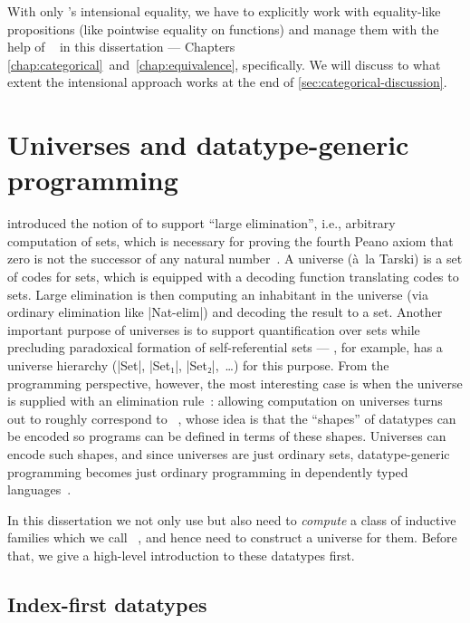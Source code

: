 With only \Agda's intensional equality, we have to explicitly work with equality-like propositions (like pointwise equality on functions) and manage them with the help of ~\citep{Barthe-setoids} in this dissertation --- Chapters \ref{chap:categorical}~and~\ref{chap:equivalence}, specifically.
We will discuss to what extent the intensional approach works at the end of \autoref{sec:categorical-discussion}.

\section{Universes and datatype-generic programming}
\label{sec:universes}

\citet{ML-TT84} introduced the notion of  to support ``large elimination'', i.e., arbitrary computation of sets, which is necessary for proving the fourth Peano axiom that zero is not the successor of any natural number~\citep{Smith-independence-fourth-axiom}.
A universe (à~la Tarski) is a set of codes for sets, which is equipped with a decoding function translating codes to sets.
Large elimination is then computing an inhabitant in the universe (via ordinary elimination like |Nat-elim|) and decoding the result to a set.
Another important purpose of universes is to support quantification over sets while precluding paradoxical formation of self-referential sets --- \Agda, for example, has a universe hierarchy (|Set|, |Set₁|, |Set₂|,~\ldots\!) for this purpose.
From the programming perspective, however, the most interesting case is when the universe is supplied with an elimination rule~\citep[Section~14.2]{Nordstrom-programming}: allowing computation on universes turns out to roughly correspond to ~\citep{Gibbons-DGP}, whose idea is that the ``shapes'' of datatypes can be encoded so programs can be defined in terms of these shapes.
Universes can encode such shapes, and since universes are just ordinary sets, datatype-generic programming becomes just ordinary programming in dependently typed languages~\citep{Altenkirch-GP-within-DTP}.

In this dissertation we not only use but also need to \emph{compute} a class of inductive families which we call ~\citep{Chapman-levitation, Dagand-functional-ornaments}, and hence need to construct a universe for them.
Before that, we give a high-level introduction to these datatypes first.

\subsection{Index-first datatypes}
\label{sec:index-first-datatypes}

